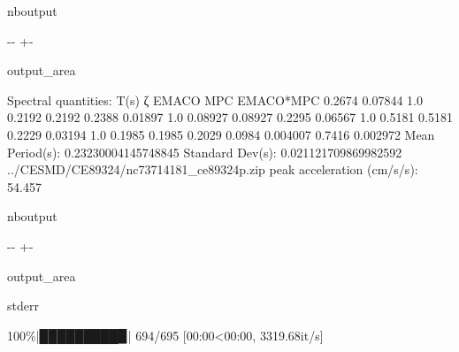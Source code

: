 \documentclass[letterpaper,10pt,english]{sphinxmanual}
\begin{document}
\begin{sphinxuseclass}{nboutput}
{

\kern-\sphinxverbatimsmallskipamount\kern-\baselineskip
\kern+\FrameHeightAdjust\kern-\fboxrule
\vspace{\nbsphinxcodecellspacing}

\begin{sphinxuseclass}{output_area}
\begin{sphinxuseclass}{}


\begin{sphinxVerbatim}[commandchars=\\\{\}]
Spectral quantities:
       T(s)        ζ        EMACO        MPC     EMACO*MPC
      0.2674     0.07844    1.0        0.2192     0.2192
      0.2388     0.01897    1.0        0.08927    0.08927
      0.2295     0.06567    1.0        0.5181     0.5181
      0.2229     0.03194    1.0        0.1985     0.1985
      0.2029     0.0984     0.004007   0.7416     0.002972
Mean Period(s): 0.23230004145748845
Standard Dev(s): 0.021121709869982592
../CESMD/CE89324/nc73714181\_ce89324p.zip
peak acceleration (cm/s/s): 54.457
\end{sphinxVerbatim}



\end{sphinxuseclass}
\end{sphinxuseclass}
}

\end{sphinxuseclass}
\begin{sphinxuseclass}{nboutput}
{

\kern-\sphinxverbatimsmallskipamount\kern-\baselineskip
\kern+\FrameHeightAdjust\kern-\fboxrule
\vspace{\nbsphinxcodecellspacing}

\begin{sphinxuseclass}{output_area}
\begin{sphinxuseclass}{stderr}


\begin{sphinxVerbatim}[commandchars=\\\{\}]
100\%|█████████▉| 694/695 [00:00<00:00, 3319.68it/s]
\end{sphinxVerbatim}



\end{sphinxuseclass}
\end{sphinxuseclass}
}

\end{sphinxuseclass}
\end{document}
